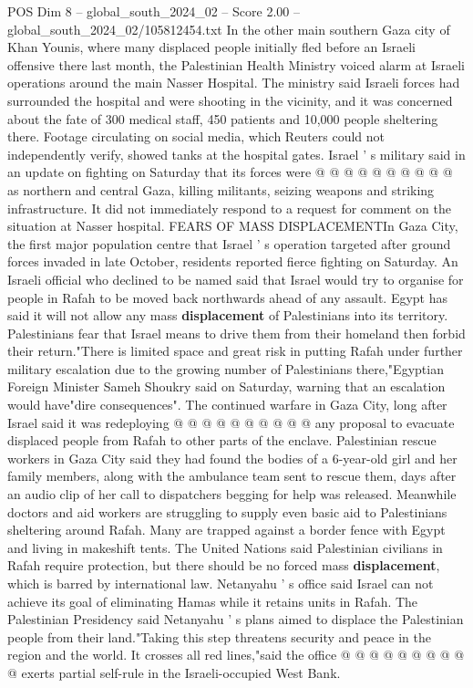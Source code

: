 \begin{textsample}{POS Dim 8 – global\_south\_2024\_02 – Score 2.00 – global\_south\_2024\_02/105812454.txt}
In the other main southern Gaza city of Khan Younis, where many displaced people initially fled before an Israeli offensive there last month, the Palestinian Health Ministry voiced alarm at Israeli operations around the main Nasser Hospital.
The ministry said Israeli forces had surrounded the hospital and were shooting in the vicinity, and it was concerned about the fate of 300 medical staff, 450 patients and 10,000 people sheltering there.
Footage circulating on social media, which Reuters could not independently verify, showed tanks at the hospital gates.
Israel ' s military said in an update on fighting on Saturday that its forces were @ @ @ @ @ @ @ @ @ @ as northern and central Gaza, killing militants, seizing weapons and striking infrastructure.
It did not immediately respond to a request for comment on the situation at Nasser hospital.
FEARS OF MASS DISPLACEMENTIn Gaza City, the first major population centre that Israel ' s operation targeted after ground forces invaded in late October, residents reported fierce fighting on Saturday.
An Israeli official who declined to be named said that Israel would try to organise for people in Rafah to be moved back northwards ahead of any assault.
Egypt has said it will not allow any mass \textbf{displacement} of Palestinians into its territory.
Palestinians fear that Israel means to drive them from their homeland then forbid their return."There is limited space and great risk in putting Rafah under further military escalation due to the growing number of Palestinians there,"Egyptian Foreign Minister Sameh Shoukry said on Saturday, warning that an escalation would have"dire consequences".
The continued warfare in Gaza City, long after Israel said it was redeploying @ @ @ @ @ @ @ @ @ @ any proposal to evacuate displaced people from Rafah to other parts of the enclave.
Palestinian rescue workers in Gaza City said they had found the bodies of a 6-year-old girl and her family members, along with the ambulance team sent to rescue them, days after an audio clip of her call to dispatchers begging for help was released.
Meanwhile doctors and aid workers are struggling to supply even basic aid to Palestinians sheltering around Rafah.
Many are trapped against a border fence with Egypt and living in makeshift tents.
The United Nations said Palestinian civilians in Rafah require protection, but there should be no forced mass \textbf{displacement}, which is barred by international law.
Netanyahu ' s office said Israel can not achieve its goal of eliminating Hamas while it retains units in Rafah.
The Palestinian Presidency said Netanyahu ' s plans aimed to displace the Palestinian people from their land."Taking this step threatens security and peace in the region and the world.
It crosses all red lines,"said the office @ @ @ @ @ @ @ @ @ @ exerts partial self-rule in the Israeli-occupied West Bank.

\end{textsample}
